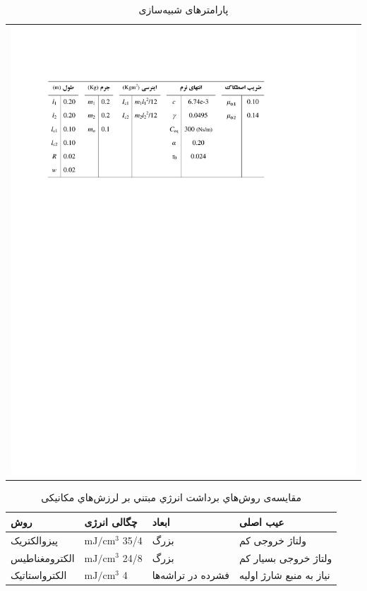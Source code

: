 \begin{table}[!htb]
\caption{پارامترهای شبیه‌سازی}
\centering
\begin{tabular}{c}
\includegraphics[scale=0.9]{Figures/SampleTable1.pdf} 
\end{tabular}
\vspace{-\baselineskip}
\label{Tbl:SampleTable1}
\end{table}

\begin{table}[!htb]
\caption{مقايسه‌ی روش‌هاي برداشت انرژي مبتني بر لرزش‌هاي مکانيکی}
\centering
\begin{tabular}{@{}|p{}|p{}|p{}|p{}|@{}}
\hline
روش
& 
چگالی انرژی
& 
ابعاد
& 
عیب اصلی
\\ \hline \hline
پیزوالکتریک
& 
$\mathrm{mJ/cm^3}$ 35/4
& 
بزرگ
& 
ولتاژ خروجی کم
\\ \hline
الکترومغناطیس
& 
$\mathrm{mJ/cm^3}$ 24/8
& 
بزرگ
& 
ولتاژ خروجی بسیار کم
\\ \hline
الکترواستاتیک
& 
$\mathrm{mJ/cm^3}$ 4
& 
فشرده در تراشه‌ها
& 
نیاز به منبع شارژ اولیه
\\ \hline
\end{tabular}
\label{Tbl:SampleTable2}
\vspace{-\baselineskip}
\end{table}

